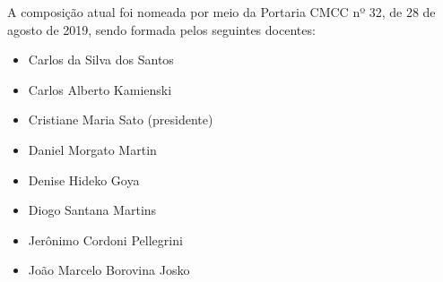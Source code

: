 A composição atual foi nomeada por meio da Portaria CMCC nº 32, de 28 de agosto de 2019, sendo
formada pelos seguintes docentes:
\begin{itemize}
    \item Carlos da Silva dos Santos
    \item Carlos Alberto Kamienski
    \item Cristiane Maria Sato (presidente)
    \item Daniel Morgato Martin
    \item Denise Hideko Goya
    \item Diogo Santana Martins
    \item Jerônimo Cordoni Pellegrini
    \item João Marcelo Borovina Josko
\end{itemize}
